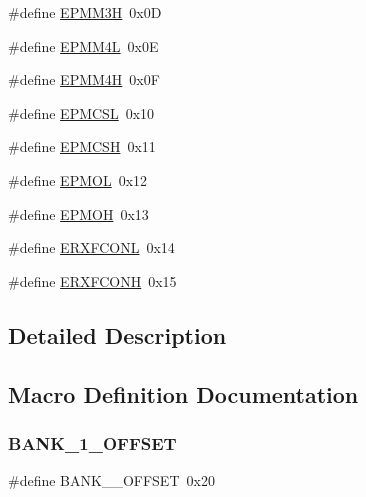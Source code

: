 \begin{DoxyCompactItemize}
\item 
\#define \mbox{\hyperlink{group___b_a_n_k__1_ga8d37bb37ae9fbea019781cec337d7490}{E\+P\+M\+M3H}}~0x0D
\item 
\#define \mbox{\hyperlink{group___b_a_n_k__1_ga75e94a2c999695e7ae2694399aea092f}{E\+P\+M\+M4L}}~0x0E
\item 
\#define \mbox{\hyperlink{group___b_a_n_k__1_gae8c535ff10d1ebd188a86f99a7c11cdf}{E\+P\+M\+M4H}}~0x0F
\item 
\#define \mbox{\hyperlink{group___b_a_n_k__1_ga63e21e6d3b5926b59207f79ff66f977d}{E\+P\+M\+C\+SL}}~0x10
\item 
\#define \mbox{\hyperlink{group___b_a_n_k__1_gaea835cc109c3eb4cfedc6f3ad4d7c410}{E\+P\+M\+C\+SH}}~0x11
\item 
\#define \mbox{\hyperlink{group___b_a_n_k__1_gaef01aecd2f0097fc30bf29fe24ab1d05}{E\+P\+M\+OL}}~0x12
\item 
\#define \mbox{\hyperlink{group___b_a_n_k__1_ga432a59eb0f0ccd8d231c82b039dc113d}{E\+P\+M\+OH}}~0x13
\item 
\#define \mbox{\hyperlink{group___b_a_n_k__1_ga72059edee50bfe91033fff8ff35e1186}{E\+R\+X\+F\+C\+O\+NL}}~0x14
\item 
\#define \mbox{\hyperlink{group___b_a_n_k__1_ga0e5b0355822b0e1d00fd1661d80edce9}{E\+R\+X\+F\+C\+O\+NH}}~0x15
\end{DoxyCompactItemize}


\subsection{Detailed Description}


\subsection{Macro Definition Documentation}
\mbox{\label{group___b_a_n_k__1_gae57b98d650d14147609e03fc9a65cd02}} 
\subsubsection{\texorpdfstring{BANK\_1\_OFFSET}{BANK\_1\_OFFSET}}
{\footnotesize\ttfamily \#define B\+A\+N\+K\+\_\+\_\+\+O\+F\+F\+S\+ET~0x20}

\mbox{\label{group___b_a_n_k__1_gab1713ab4c7c67c49b7b733e3c03ba0c4}} 
